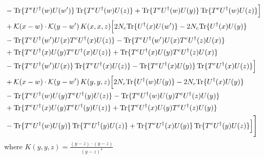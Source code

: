 \documentclass[9pt]{article}
\numberwithin{equation}{section}
\begin{document}
\begin{align}
&-{\rm Tr}\{T^eU^\dagger(w)U(w')\}\,{\rm Tr}\{T^eU^\dagger(w)U(z)\}+{\rm Tr}\{T^eU^\dagger(w)U(y)\}\,{\rm Tr}\{T^eU^\dagger(w)U(z)\}\Big]\notag\\
&+\mathcal K(x-w)\cdot\mathcal K(y-w')\,K(x,x,z)\Big[2 N_{c}{\rm Tr}\{U^\dagger(x)U(w')\}-2 N_{c}{\rm Tr}\{U^\dagger(x)U(y)\}\notag\\
&-{\rm Tr}\{T^eU^\dagger(w')U(x)T^eU^\dagger(x)U(z)\}-{\rm Tr}\{T^eU^\dagger(w')U(x)T^eU^\dagger(z)U(x)\}\notag\\
&+{\rm Tr}\{T^eU^\dagger(x)U(y)T^eU^\dagger(x)U(z)\}+{\rm Tr}\{T^eU^\dagger(x)U(y)T^eU^\dagger(z)U(x)\}\notag\\
&-{\rm Tr}\{T^eU^\dagger(w')U(x)\}\,{\rm Tr}\{T^eU^\dagger(x)U(z)\}-{\rm Tr}\{T^eU^\dagger(x)U(y)\}\,{\rm Tr}\{T^eU^\dagger(x)U(z)\}\Big]\notag\\
&+\mathcal K(x-w)\cdot\mathcal K(y-w')\,K(y,y,z)\Big[2 N_{c}{\rm Tr}\{U^\dagger(w)U(y)\}-2 N_{c}{\rm Tr}\{U^\dagger(x)U(y)\}\notag\\
&-{\rm Tr}\{T^eU^\dagger(w)U(y)T^eU^\dagger(y)U(z)\}-{\rm Tr}\{T^eU^\dagger(w)U(y)T^eU^\dagger(z)U(y)\}\notag\\
&+{\rm Tr}\{T^eU^\dagger(x)U(y)T^eU^\dagger(y)U(z)\}+{\rm Tr}\{T^eU^\dagger(x)U(y)T^eU^\dagger(z)U(y)\}\notag\\
&-{\rm Tr}\{T^eU^\dagger(w)U(y)\}\,{\rm Tr}\{T^eU^\dagger(y)U(z)\}+{\rm Tr}\{T^eU^\dagger(x)U(y)\}\,{\rm Tr}\{T^eU^\dagger(y)U(z)\}\Big]\Bigg]
\end{align}
where $K(y,y,z) = \frac{(y-z)\cdot (y-z)}{(y-z)^{4}}$
\end{document}
